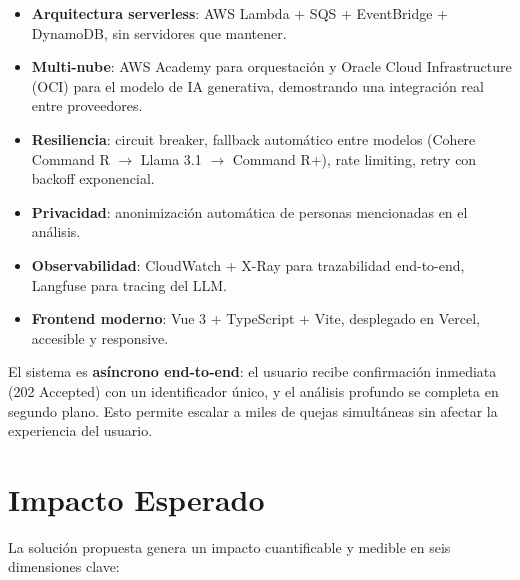 \documentclass[11pt,a4paper]{article}
\begin{document}
\begin{itemize}[leftmargin=*]
    \item \textbf{Arquitectura serverless}: AWS Lambda + SQS + EventBridge + DynamoDB, sin servidores que mantener.
    \item \textbf{Multi-nube}: AWS Academy para orquestaci\'on y Oracle Cloud Infrastructure (OCI) para el modelo de IA generativa, demostrando una integraci\'on real entre proveedores.
    \item \textbf{Resiliencia}: circuit breaker, fallback autom\'atico entre modelos (Cohere Command R $\rightarrow$ Llama 3.1 $\rightarrow$ Command R+), rate limiting, retry con backoff exponencial.
    \item \textbf{Privacidad}: anonimizaci\'on autom\'atica de personas mencionadas en el an\'alisis.
    \item \textbf{Observabilidad}: CloudWatch + X-Ray para trazabilidad end-to-end, Langfuse para tracing del LLM.
    \item \textbf{Frontend moderno}: Vue 3 + TypeScript + Vite, desplegado en Vercel, accesible y responsive.
\end{itemize}

\begin{tcolorbox}[colback=primary!5!white, colframe=primary, title=\textbf{Diferenciador clave}]
El sistema es \textbf{as\'incrono end-to-end}: el usuario recibe confirmaci\'on inmediata (202 Accepted) con un identificador \'unico, y el an\'alisis profundo se completa en segundo plano. Esto permite escalar a miles de quejas simult\'aneas sin afectar la experiencia del usuario.
\end{tcolorbox}

\section{Impacto Esperado}

La soluci\'on propuesta genera un impacto cuantificable y medible en seis dimensiones clave:
\end{document}
